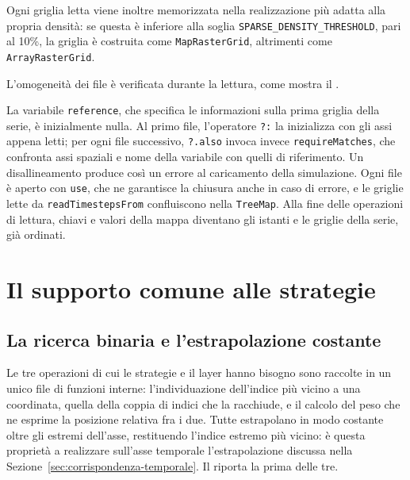 Ogni griglia letta viene inoltre memorizzata nella realizzazione più adatta alla propria
densità: se questa è inferiore
alla soglia \texttt{SPARSE\_DENSITY\_THRESHOLD}, pari al 10\%, la griglia è costruita come
\texttt{MapRasterGrid}, altrimenti come \texttt{ArrayRasterGrid}.

L'omogeneità dei file è verificata durante la lettura, come mostra il .



La variabile \texttt{reference}, che specifica le informazioni sulla prima griglia
della serie, è inizialmente nulla. Al primo file, l'operatore \texttt{?:}
la inizializza con gli assi appena letti; per ogni file successivo, \texttt{?.also} invoca
invece \texttt{requireMatches}, che confronta assi spaziali e nome della variabile con quelli
di riferimento. Un disallineamento produce così un errore al caricamento della simulazione.
Ogni file è aperto con \texttt{use}, che ne garantisce la chiusura anche in caso di errore,
e le griglie lette da \texttt{readTimestepsFrom} confluiscono nella \texttt{TreeMap}.
Alla fine delle operazioni di lettura, chiavi e valori della mappa diventano gli
istanti e le griglie della serie, già ordinati.

\section{Il supporto comune alle strategie}
\label{sec:strategie-impl}

\subsection{La ricerca binaria e l'estrapolazione costante}
\label{subsec:ricerca-impl}

Le tre operazioni di cui le strategie e il layer hanno bisogno sono raccolte in un unico
file di funzioni interne: l'individuazione dell'indice più vicino a una coordinata, quella
della coppia di indici che la racchiude, e il calcolo del peso che ne esprime la posizione
relativa fra i due. Tutte estrapolano in modo costante oltre gli estremi dell'asse,
restituendo l'indice estremo più vicino: è questa proprietà a realizzare sull'asse
temporale l'estrapolazione discussa nella Sezione~\ref{sec:corrispondenza-temporale}.
Il  riporta la prima delle tre.


